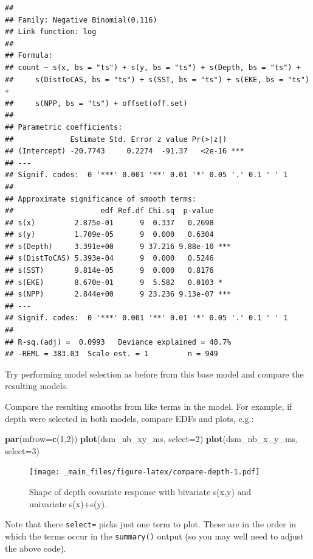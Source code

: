 \documentclass[]{book}
\newenvironment{Shaded}{\begin{snugshade}}{\end{snugshade}}
\newcommand{\KeywordTok}[1]{\textcolor[rgb]{0.13,0.29,0.53}{\textbf{#1}}}
\newcommand{\DataTypeTok}[1]{\textcolor[rgb]{0.13,0.29,0.53}{#1}}
\newcommand{\DecValTok}[1]{\textcolor[rgb]{0.00,0.00,0.81}{#1}}
\newcommand{\NormalTok}[1]{#1}
\theoremstyle{definition}
\theoremstyle{definition}
\theoremstyle{remark}
\begin{document}
\begin{verbatim}
## 
## Family: Negative Binomial(0.116) 
## Link function: log 
## 
## Formula:
## count ~ s(x, bs = "ts") + s(y, bs = "ts") + s(Depth, bs = "ts") + 
##     s(DistToCAS, bs = "ts") + s(SST, bs = "ts") + s(EKE, bs = "ts") + 
##     s(NPP, bs = "ts") + offset(off.set)
## 
## Parametric coefficients:
##             Estimate Std. Error z value Pr(>|z|)    
## (Intercept) -20.7743     0.2274  -91.37   <2e-16 ***
## ---
## Signif. codes:  0 '***' 0.001 '**' 0.01 '*' 0.05 '.' 0.1 ' ' 1
## 
## Approximate significance of smooth terms:
##                    edf Ref.df Chi.sq  p-value    
## s(x)         2.875e-01      9  0.337   0.2698    
## s(y)         1.709e-05      9  0.000   0.6304    
## s(Depth)     3.391e+00      9 37.216 9.88e-10 ***
## s(DistToCAS) 5.393e-04      9  0.000   0.5246    
## s(SST)       9.814e-05      9  0.000   0.8176    
## s(EKE)       8.670e-01      9  5.582   0.0103 *  
## s(NPP)       2.844e+00      9 23.236 9.13e-07 ***
## ---
## Signif. codes:  0 '***' 0.001 '**' 0.01 '*' 0.05 '.' 0.1 ' ' 1
## 
## R-sq.(adj) =  0.0993   Deviance explained = 40.7%
## -REML = 383.03  Scale est. = 1         n = 949
\end{verbatim}

Try performing model selection as before from this base model and
compare the resulting models.

Compare the resulting smooths from like terms in the model. For example,
if depth were selected in both models, compare EDFs and plots, e.g.:

\begin{Shaded}
\begin{Highlighting}[]
\KeywordTok{par}\NormalTok{(}\DataTypeTok{mfrow=}\KeywordTok{c}\NormalTok{(}\DecValTok{1}\NormalTok{,}\DecValTok{2}\NormalTok{))}
\KeywordTok{plot}\NormalTok{(dsm_nb_xy_ms, }\DataTypeTok{select=}\DecValTok{2}\NormalTok{)}
\KeywordTok{plot}\NormalTok{(dsm_nb_x_y_ms, }\DataTypeTok{select=}\DecValTok{3}\NormalTok{)}
\end{Highlighting}
\end{Shaded}

\begin{figure}
\centering
\texttt{[image: \_main\_files/figure-latex/compare-depth-1.pdf]}
\caption{\label{fig:compare-depth}Shape of depth covariate response with
bivariate s(x,y) and univariate s(x)+s(y).}
\end{figure}

Note that there \texttt{select=} picks just one term to plot. These are
in the order in which the terms occur in the \texttt{summary()} output
(so you may well need to adjust the above code).
\end{document}
